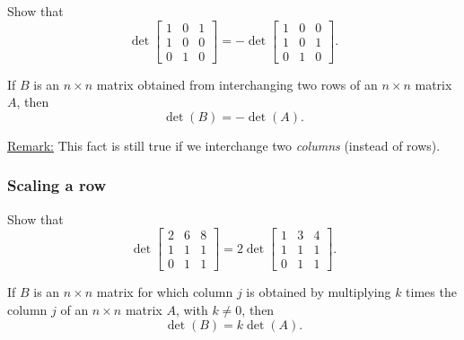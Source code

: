 \documentclass[20pt,a4paper]{extarticle}
\newcounter{example}
\newcounter{theorem}
\begin{document}
\begin{example}
Show that 
	\[
		\det \begin{bmatrix} 
		1 & 0 & 1 \\ 1 & 0 & 0 \\ 0 & 1 & 0
		\end{bmatrix} = - \det \begin{bmatrix} 1 & 0 & 0 \\ 1 & 0 & 1 \\ 0 & 1 & 0 \end{bmatrix} .
	\]
\end{example}

\begin{solution}

\end{solution}

\vfill 

\begin{theorem}
If $B$ is an $n \times n$ matrix obtained from interchanging two rows of an $n \times n$ matrix $A$, then
	\[
		\det (B) = - \det (A) .
	\]
\end{theorem}

\underline{Remark:} This fact is still true if we interchange two \textit{columns} (instead of rows).

\newpage 

\subsubsection{Scaling a row}

\begin{example}
Show that
	\[
		\det \begin{bmatrix} 2 & 6 & 8 \\ 1 & 1 & 1 \\ 0 & 1 & 1 \end{bmatrix} = 2 \det \begin{bmatrix} 1 & 3 & 4 \\ 1 & 1 & 1 \\ 0 & 1 & 1 \end{bmatrix} .
	\]
\end{example}

\begin{solution}

\end{solution}

\vfill 

\begin{theorem}
If $B$ is an $n \times n$ matrix for which column $j$ is obtained by multiplying $k$ times the column $j$ of an $n \times n$ matrix $A$, with $k \neq 0$, then
	\[
		\det (B) = k \det (A) .
	\]
\end{theorem}
\end{document}
